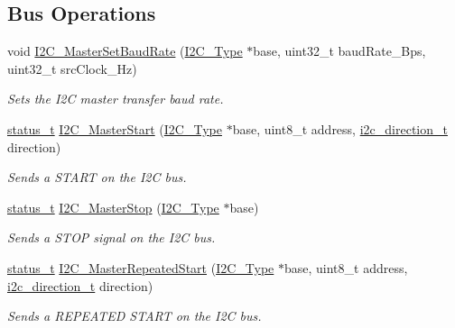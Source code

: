 \subsection*{Bus Operations}
\begin{DoxyCompactItemize}
\item 
void \mbox{\hyperlink{group__i2c__driver_gafeab1d5249a8b39c8d9e1a54a85c23f0}{I2\+C\+\_\+\+Master\+Set\+Baud\+Rate}} (\mbox{\hyperlink{struct_i2_c___type}{I2\+C\+\_\+\+Type}} $\ast$base, uint32\+\_\+t baud\+Rate\+\_\+\+Bps, uint32\+\_\+t src\+Clock\+\_\+\+Hz)
\begin{DoxyCompactList}\small\item\em Sets the I2C master transfer baud rate. \end{DoxyCompactList}\item 
\mbox{\hyperlink{group__ksdk__common_gaaabdaf7ee58ca7269bd4bf24efcde092}{status\+\_\+t}} \mbox{\hyperlink{group__i2c__driver_ga7664234966e4162e952b6d57efcaa8a6}{I2\+C\+\_\+\+Master\+Start}} (\mbox{\hyperlink{struct_i2_c___type}{I2\+C\+\_\+\+Type}} $\ast$base, uint8\+\_\+t address, \mbox{\hyperlink{group__i2c__driver_ga4bf954d998f086594eece268c780bec7}{i2c\+\_\+direction\+\_\+t}} direction)
\begin{DoxyCompactList}\small\item\em Sends a S\+T\+A\+RT on the I2C bus. \end{DoxyCompactList}\item 
\mbox{\hyperlink{group__ksdk__common_gaaabdaf7ee58ca7269bd4bf24efcde092}{status\+\_\+t}} \mbox{\hyperlink{group__i2c__driver_gaf46a8cc094fc18c6cadea8de71448723}{I2\+C\+\_\+\+Master\+Stop}} (\mbox{\hyperlink{struct_i2_c___type}{I2\+C\+\_\+\+Type}} $\ast$base)
\begin{DoxyCompactList}\small\item\em Sends a S\+T\+OP signal on the I2C bus. \end{DoxyCompactList}\item 
\mbox{\hyperlink{group__ksdk__common_gaaabdaf7ee58ca7269bd4bf24efcde092}{status\+\_\+t}} \mbox{\hyperlink{group__i2c__driver_ga42ff265d25e713326c7d152adf350147}{I2\+C\+\_\+\+Master\+Repeated\+Start}} (\mbox{\hyperlink{struct_i2_c___type}{I2\+C\+\_\+\+Type}} $\ast$base, uint8\+\_\+t address, \mbox{\hyperlink{group__i2c__driver_ga4bf954d998f086594eece268c780bec7}{i2c\+\_\+direction\+\_\+t}} direction)
\begin{DoxyCompactList}\small\item\em Sends a R\+E\+P\+E\+A\+T\+ED S\+T\+A\+RT on the I2C bus. \end{DoxyCompactList}\item 

\end{DoxyCompactItemize}
